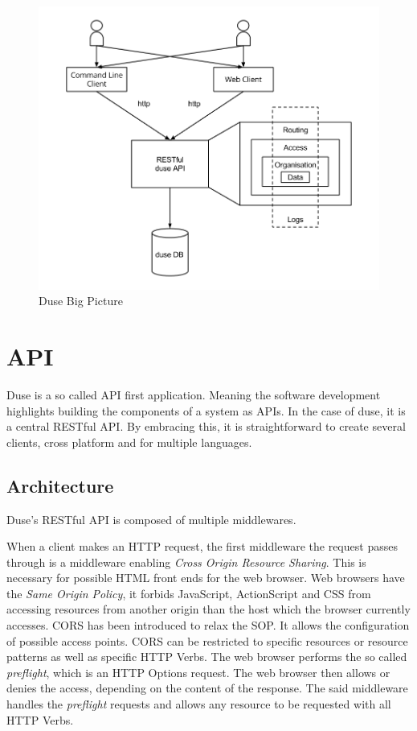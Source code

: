 \begin{figure}
  \includegraphics[scale=0.55]{pictures/big_picture.png}
  \caption{Duse Big Picture}
  \centering
  \label{fig:big_picture}
\end{figure}

\section{API}

Duse is a so called API first application. Meaning the software development
highlights building the components of a system as APIs. In the case of duse, it
is a central RESTful API. By embracing this, it is straightforward to create
several clients, cross platform and for multiple languages.

\subsection{Architecture}

Duse's RESTful API is composed of multiple middlewares.

When a client makes an HTTP request, the first middleware the request passes
through is a middleware enabling \textit{Cross Origin Resource Sharing}. This
is necessary for possible HTML front ends for the web browser. Web browsers have
the \textit{Same Origin Policy}, it forbids JavaScript, ActionScript and CSS
from accessing resources from another origin than the host which the browser
currently accesses. CORS has been introduced to relax the SOP. It allows the
configuration of possible access points. CORS can be restricted to specific
resources or resource patterns as well as specific HTTP Verbs. The web browser
performs the so called \textit{preflight}, which is an HTTP Options request. The
web browser then allows or denies the access, depending on the content of the
response. The said middleware handles the \textit{preflight} requests and
allows any resource to be requested with all HTTP Verbs.

